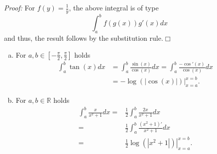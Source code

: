 {\em Proof:} For $f(y)=\frac1y$, the above integral is of type
\[\int_a^bf(g(x))g'(x)dx\]
and thus, the result follows by the substitution rule.\hfill$\Box$
\whiteskip

\begin{example}
\begin{enumerate}[a)]
\item
For $a,b\in\left[-\frac\pi2,\frac\pi2\right]$ holds
\[\begin{aligned}
\int_a^b\tan(x)dx&=\int_a^b\frac{\sin(x)}{\cos(x)}dx=\int_a^b\frac{-\cos'(x)}{\cos(x)}dx\\&=-\left.\log(|\cos(x)|)\right|_{x=a}^{x=b}
.\end{aligned}
\]
\item For $a,b\in\mathbb{R}$ holds
\[\begin{aligned}
\int_a^b\frac{x}{x^2+1}dx=&\frac12\int_a^b\frac{2x}{x^2+1}dx\\=&\frac12\int_a^b\frac{(x^2+1)'}{x^2+1}dx\\=&\frac12\left.\log(|x^2+1|)\right|_{x=a}^{x=b}
.\end{aligned}\]
\end{enumerate}
\end{example}

